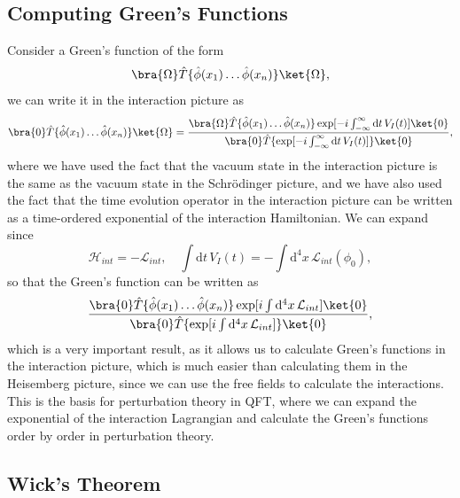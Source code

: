 \subsection{Computing Green's Functions}

Consider a Green's function of the form
\[
    \bra{\Omega} \hat{T} \{ \hat{\phi} (x_1) \dots \hat{\phi} (x_n) \} \ket{\Omega},
\]
we can write it in the interaction picture as
\[
    \bra{0} \hat{T} \{ \hat{\phi} (x_1) \dots \hat{\phi} (x_n) \} \ket{\Omega} = \frac{\bra{\Omega} \hat{T} \{ \hat{\phi} (x_1) \dots \hat{\phi}(x_n)  \} \exp[ -i \int_{-\infty}^{\infty} \mathrm{d} t \, V_I(t) ] \ket{0}}{\bra{0} \hat{T} \{ \exp[ -i \int_{-\infty}^{\infty} \mathrm{d} t \, V_I(t) ] \} \ket{0}},
\]
where we have used the fact that the vacuum state in the interaction picture is the same as the vacuum state in the Schrödinger picture, and we have also used the fact that the time evolution operator in the interaction picture can be written as a time-ordered exponential of the interaction Hamiltonian. We can expand since
\[
    \mathcal{H}_{int} = -\mathcal{L}_{int}, \quad \int \mathrm{d} t \, V_I(t) = - \int \mathrm{d}^4 x \, \mathcal{L}_{int} (\phi_0),
\]
so that the Green's function can be written as
\[
    \frac{\bra{0} \hat{T} \{ \hat{\phi} (x_1) \dots \hat{\phi}(x_n)  \} \exp[ i \int \mathrm{d}^4 x \, \mathcal{L}_{int} ] \ket{0}}{\bra{0} \hat{T} \{ \exp[ i \int \mathrm{d}^4 x \, \mathcal{L}_{int} ] \} \ket{0}},
\]
which is a very important result, as it allows us to calculate Green's functions in the interaction picture, which is much easier than calculating them in the Heisemberg picture, since we can use the free fields to calculate the interactions. This is the basis for perturbation theory in QFT, where we can expand the exponential of the interaction Lagrangian and calculate the Green's functions order by order in perturbation theory.

\subsection{Wick's Theorem}

